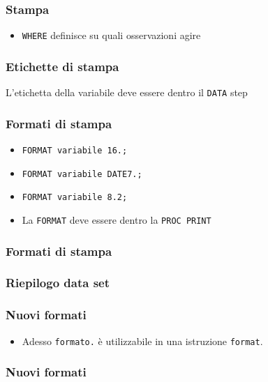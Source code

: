 \begin{frame}[containsverbatim]\frametitle{Stampa}
  \begin{itemize}
  \item
    \verb+WHERE+ definisce su quali osservazioni agire
  \end{itemize}\end{frame}

\begin{frame}[containsverbatim]\frametitle{Etichette di stampa}

  \vspace{1em}
  L'etichetta della variabile deve essere dentro il \verb!DATA! step
\end{frame}




\begin{frame}[containsverbatim]\frametitle{Formati di stampa}
  \begin{itemize}
  \item
    \verb!FORMAT variabile 16.;!
  \item
    \verb!FORMAT variabile DATE7.;!
  \item
    \verb!FORMAT variabile 8.2;!
  \item
    La \verb!FORMAT! deve essere dentro la \verb!PROC PRINT!
  \end{itemize}
\end{frame}

\begin{frame}[containsverbatim]\frametitle{Formati di stampa}
\end{frame}



\begin{frame}[containsverbatim]\frametitle{Riepilogo data set}
\end{frame}

\begin{frame}[containsverbatim]\frametitle{Nuovi formati}
  \begin{itemize}
  \item
    Adesso \texttt{formato.} {\`e} utilizzabile in una istruzione  \texttt{format}.
  \end{itemize}
\end{frame}

\begin{frame}[containsverbatim]\frametitle{Nuovi formati}
\end{frame}


